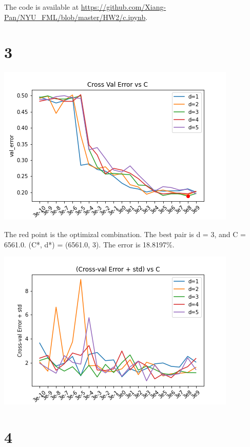 \documentclass{article}
\begin{document}
The code is available at \url{https://github.com/Xiang-Pan/NYU_FML/blob/master/HW2/c.ipynb}.

\section*{3}
\includegraphics[width=\textwidth]{images/C3_cross_val_error_vs_d.png}

The red point is the optimizal combination. The best pair is d = 3, and C = 6561.0. (C*, d*) = (6561.0, 3). The error is 18.8197\%.


\includegraphics[width=\textwidth]{./images/C3_cross_val_error_plus_std_vs_d.png}


\section*{4}
\end{document}
